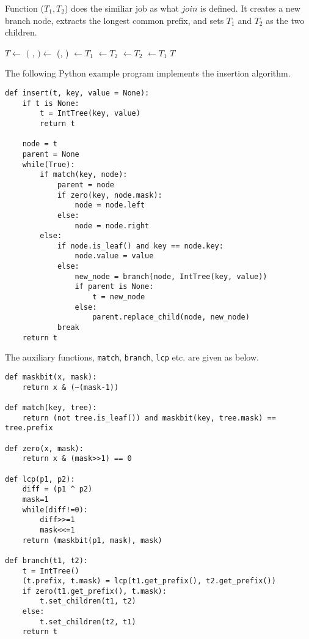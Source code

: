 \documentclass{article}
\begin{document}
Function ($T_1, T_2$) does the similiar job as what $join$ is defined.
It creates a new branch node, extracts the longest common prefix, and sets $T_1$ and
$T_2$ as the two children.

\begin{algorithmic}[1]
  \State $T \gets$ 
  \State $($ ,  $) \gets$ (, )
    \State {} $\gets T_1$
    \State {} $\gets T_2$
  \Else
    \State {} $\gets T_2$
    \State {} $\gets T_1$
  \EndIf
  \State \Return $T$
\EndFunction
\end{algorithmic}


The following Python example program implements the insertion algorithm.

\lstset{language=Python}
\begin{lstlisting}
def insert(t, key, value = None):
    if t is None:
        t = IntTree(key, value)
        return t

    node = t
    parent = None
    while(True):
        if match(key, node):
            parent = node
            if zero(key, node.mask):
                node = node.left
            else:
                node = node.right
        else:
            if node.is_leaf() and key == node.key:
                node.value = value
            else:
                new_node = branch(node, IntTree(key, value))
                if parent is None:
                    t = new_node
                else:
                    parent.replace_child(node, new_node)
            break
    return t
\end{lstlisting}

The auxiliary functions, \texttt{match}, \texttt{branch}, \texttt{lcp} etc. are given as below.

\begin{lstlisting}
def maskbit(x, mask):
    return x & (~(mask-1))

def match(key, tree):
    return (not tree.is_leaf()) and maskbit(key, tree.mask) == tree.prefix

def zero(x, mask):
    return x & (mask>>1) == 0

def lcp(p1, p2):
    diff = (p1 ^ p2)
    mask=1
    while(diff!=0):
        diff>>=1
        mask<<=1
    return (maskbit(p1, mask), mask)

def branch(t1, t2):
    t = IntTree()
    (t.prefix, t.mask) = lcp(t1.get_prefix(), t2.get_prefix())
    if zero(t1.get_prefix(), t.mask):
        t.set_children(t1, t2)
    else:
        t.set_children(t2, t1)
    return t
\end{lstlisting}
\end{document}
